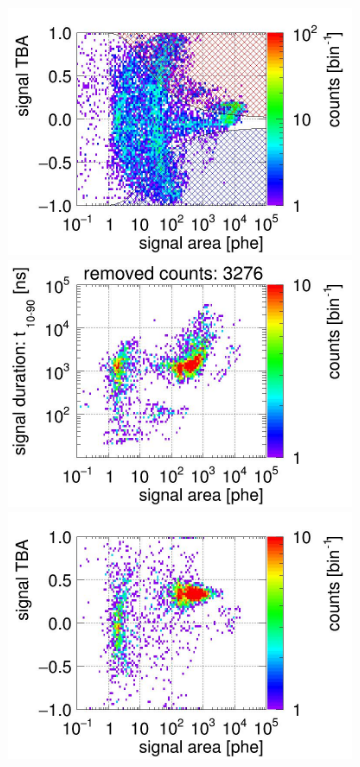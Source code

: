 \begin{landscape}
\begin{figure}[!p]
\begin{subfigure}[t]{0.33\textwidth}
			\includegraphics[width=\figurewidth,clip,trim={0 98 0 40}]{Figures/GasTest/CutsValid/res64766/tbapa26Vecfig64766.jpg}
			\includegraphics[width=\figurewidth,clip,trim={0 98 0 10}]{Figures/GasTest/CutsValid/res64766/pdpaX26Vecfig64766.jpg}
			\includegraphics[width=\figurewidth,clip,trim={0 0 0 40}]{Figures/GasTest/CutsValid/res64766/tbapaX26Vecfig64766.jpg}

\end{subfigure}
\end{figure}
\end{landscape}
